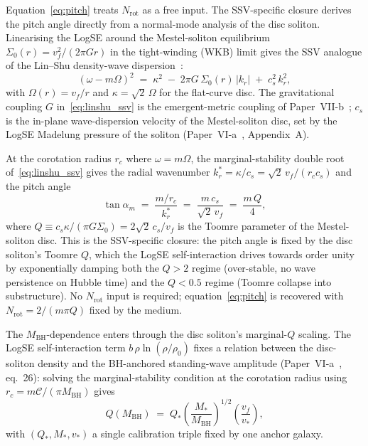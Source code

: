 \documentclass[11pt,a4paper]{article}
\begin{document}
Equation~\eqref{eq:pitch} treats $N_\mathrm{rot}$ as a free input.  The
SSV-specific closure derives the pitch angle directly from a normal-mode
analysis of the disc soliton.  Linearising the LogSE around the Mestel-soliton
equilibrium $\Sigma_0(r) = v_f^2/(2\pi G r)$ in the tight-winding (WKB) limit
gives the SSV analogue of the Lin--Shu density-wave
dispersion~\cite{linshu1964}:
\begin{equation}
  (\omega - m\Omega)^2 \;=\; \kappa^2
    \;-\; 2\pi G\,\Sigma_0(r)\,|k_r|
    \;+\; c_s^2\,k_r^2,
  \label{eq:linshu_ssv}
\end{equation}
with $\Omega(r) = v_f/r$ and $\kappa = \sqrt{2}\,\Omega$ for the flat-curve
disc.  The gravitational coupling $G$ in~\eqref{eq:linshu_ssv} is the
emergent-metric coupling of Paper~VII-b~\cite{SSV-VIIb}; $c_s$ is the
in-plane wave-dispersion velocity of the Mestel-soliton disc, set by the
LogSE Madelung pressure of the soliton (Paper~VI-a~\cite{SSV-VIa},
Appendix~A).

At the corotation radius $r_c$ where $\omega = m\Omega$, the marginal-stability
double root of~\eqref{eq:linshu_ssv} gives the radial wavenumber
$k_r^* = \kappa/c_s = \sqrt{2}\,v_f/(r_c c_s)$ and the pitch angle
\begin{equation}
  \tan\alpha_m \;=\; \frac{m/r_c}{k_r^*}
    \;=\; \frac{m\,c_s}{\sqrt{2}\,v_f}
    \;=\; \frac{m\,Q}{4},
  \label{eq:pitch_dispersion}
\end{equation}
where $Q \equiv c_s\kappa/(\pi G\Sigma_0) = 2\sqrt{2}\,c_s/v_f$ is the Toomre
parameter of the Mestel-soliton disc.  This is the SSV-specific closure:
the pitch angle is fixed by the disc soliton's Toomre $Q$, which the LogSE
self-interaction drives towards order unity by exponentially damping both
the $Q > 2$ regime (over-stable, no wave persistence on Hubble time) and
the $Q < 0.5$ regime (Toomre collapse into substructure).  No $N_\mathrm{rot}$
input is required; equation~\eqref{eq:pitch} is recovered with
$N_\mathrm{rot} = 2/(m\pi Q)$ fixed by the medium.

The $M_\mathrm{BH}$-dependence enters through the disc soliton's
marginal-$Q$ scaling.  The LogSE self-interaction term $b\,\rho\ln(\rho/\rho_0)$
fixes a relation between the disc-soliton density and the BH-anchored
standing-wave amplitude (Paper~VI-a~\cite{SSV-VIa}, eq.~26): solving the
marginal-stability condition at the corotation radius using $r_c =
m\mathcal{C}/(\pi M_\mathrm{BH})$ gives
\begin{equation}
  Q(M_\mathrm{BH}) \;=\; Q_*\!\left(\frac{M_*}{M_\mathrm{BH}}\right)^{\!1/2}
    \!\left(\frac{v_f}{v_*}\right),
  \label{eq:Q_scaling}
\end{equation}
with $(Q_*, M_*, v_*)$ a single calibration triple fixed by one anchor galaxy.
\end{document}
